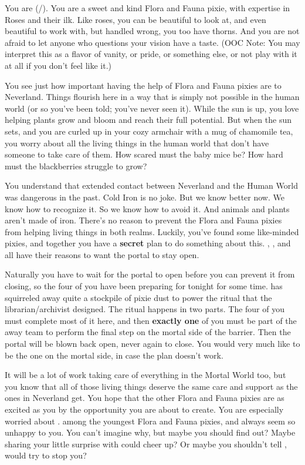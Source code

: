 \documentclass[char]{PP}
\begin{document}
\name{\cFHeart{}}

You are \cFHeart{} (\cFHeart{\They}/\cFHeart{\Them}). You are a sweet and kind Flora and Fauna pixie, with expertise in Roses and their ilk. Like roses, you can be beautiful to look at, and even beautiful to work with, but handled wrong, you too have thorns. And you are not afraid to let anyone who questions your vision have a taste. (OOC Note: You may interpret this as a flavor of vanity, or pride, or something else, or not play with it at all if you don’t feel like it.)

You see just how important having the help of Flora and Fauna pixies are to Neverland. Things flourish here in a way that is simply not possible in the human world (or so you’ve been told; you’ve never seen it). While the sun is up, you love helping plants grow and bloom and reach their full potential. But when the sun sets, and you are curled up in your cozy armchair with a mug of chamomile tea, you worry about all the living things in the human world that don’t have someone to take care of them. How scared must the baby mice be? How hard must the blackberries struggle to grow?

You understand that extended contact between Neverland and the Human World was dangerous in the past. Cold Iron is no joke. But we know better now. We know how to recognize it. So we know how to avoid it. And animals and plants aren’t made of iron. There’s no reason to prevent the Flora and Fauna pixies from helping living things in both realms. Luckily, you’ve found some like-minded pixies, and together you have a \textbf{secret} plan to do something about this. \cSLibrarian{}, \cESweet{}, and \cMIron{} all have their reasons to want the portal to stay open. 

Naturally you have to wait for the portal to open before you can prevent it from closing, so the four of you have been preparing for tonight for some time. \cMIron{} has squirreled away quite a stockpile of pixie dust to power the ritual that the librarian/archivist designed. The ritual happens in two parts. The four of you must complete most of it here, and then \textbf{exactly one} of you must be part of the away team to perform the final step on the mortal side of the barrier. Then the portal will be blown back open, never again to close. You would very much like to be the one on the mortal side, in case the plan doesn’t work.

It will be a lot of work taking care of everything in the Mortal World too, but you know that all of those living things deserve the same care and support as the ones in Neverland get. You hope that the other Flora and Fauna pixies are as excited as you by the opportunity you are about to create. You are especially worried about \cFWanabe{}. \cFWanabe{\They} \cFWanabe{\are} among the youngest Flora and Fauna pixies, and \cFWanabe{\they} always seem\cFWanabe{\verbs} so unhappy to you. You can’t imagine why, but maybe you should find out? Maybe sharing your little surprise with \cFWanabe{\them} could cheer \cFWanabe{\them} up? Or maybe you shouldn’t tell \cFWanabe{\them}, would \cFWanabe{\they} try to stop you?
\end{document}
